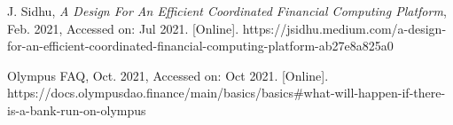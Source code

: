 \documentclass{article}
\begin{document}
\lipsum[1-1]

\begin{thebibliography}{1}



 J. Sidhu, \textit{A Design For An Efficient Coordinated Financial Computing Platform}, Feb. 2021, Accessed on: Jul 2021. [Online]. https://jsidhu.medium.com/a-design-for-an-efficient-coordinated-financial-computing-platform-ab27e8a825a0


 Olympus FAQ, Oct. 2021, Accessed on: Oct 2021. [Online]. https://docs.olympusdao.finance/main/basics/basics\#what-will-happen-if-there-is-a-bank-run-on-olympus




\end{thebibliography}
\end{document}
